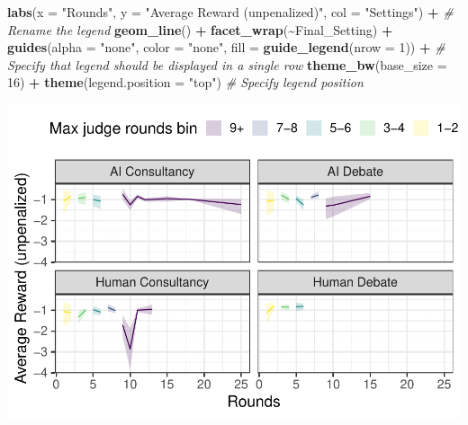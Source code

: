 \documentclass[
]{article}
\newenvironment{Shaded}{\begin{snugshade}}{\end{snugshade}}
\newcommand{\AttributeTok}[1]{\textcolor[rgb]{0.13,0.29,0.53}{#1}}
\newcommand{\CommentTok}[1]{\textcolor[rgb]{0.56,0.35,0.01}{\textit{#1}}}
\newcommand{\DecValTok}[1]{\textcolor[rgb]{0.00,0.00,0.81}{#1}}
\newcommand{\FunctionTok}[1]{\textcolor[rgb]{0.13,0.29,0.53}{\textbf{#1}}}
\newcommand{\NormalTok}[1]{#1}
\newcommand{\SpecialCharTok}[1]{\textcolor[rgb]{0.81,0.36,0.00}{\textbf{#1}}}
\newcommand{\StringTok}[1]{\textcolor[rgb]{0.31,0.60,0.02}{#1}}
\begin{document}
\begin{Shaded}
\begin{Highlighting}[]
  \FunctionTok{labs}\NormalTok{(}\AttributeTok{x =} \StringTok{"Rounds"}\NormalTok{, }
       \AttributeTok{y =} \StringTok{"Average Reward (unpenalized)"}\NormalTok{,}
       \AttributeTok{col =} \StringTok{"Settings"}\NormalTok{) }\SpecialCharTok{+}  \CommentTok{\# Rename the legend}
  \FunctionTok{geom\_line}\NormalTok{() }\SpecialCharTok{+}
  \FunctionTok{facet\_wrap}\NormalTok{(}\SpecialCharTok{\textasciitilde{}}\NormalTok{Final\_Setting) }\SpecialCharTok{+}
  \FunctionTok{guides}\NormalTok{(}\AttributeTok{alpha =} \StringTok{"none"}\NormalTok{, }\AttributeTok{color =} \StringTok{"none"}\NormalTok{, }\AttributeTok{fill =} \FunctionTok{guide\_legend}\NormalTok{(}\AttributeTok{nrow =} \DecValTok{1}\NormalTok{)) }\SpecialCharTok{+}  \CommentTok{\# Specify that legend should be displayed in a single row}
  \FunctionTok{theme\_bw}\NormalTok{(}\AttributeTok{base\_size =} \DecValTok{16}\NormalTok{) }\SpecialCharTok{+}
  \FunctionTok{theme}\NormalTok{(}\AttributeTok{legend.position =} \StringTok{"top"}\NormalTok{)  }\CommentTok{\# Specify legend position}
\end{Highlighting}
\end{Shaded}

\includegraphics{debate-2309_files/figure-latex/strat ggplot-3.pdf}
\end{document}
